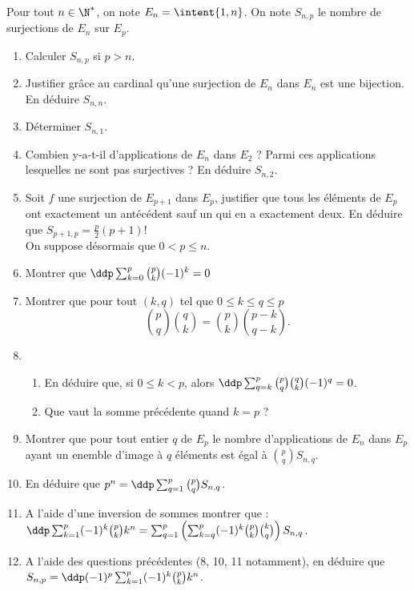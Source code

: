 



\begin{exercice}
Pour tout $n\in \N^*$, on note $E_n=\intent{1,n}$. 
On note $S_{n,p}$ le nombre de surjections de $E_n$ sur $E_p$. 
\begin{enumerate}
\item Calculer $S_{n,p}$ si $p>n$. 
\item Justifier grâce au cardinal qu'une surjection de $E_n$ dans $E_n$ est une bijection. En déduire $S_{n,n}$.
\item Déterminer $S_{n,1}$. 
\item Combien y-a-t-il d'applications de $E_n$ dans $E_2$ ? Parmi ces applications lesquelles ne sont pas surjectives ? En déduire $S_{n,2}$. 
\item Soit $f$ une surjection de $E_{p+1}$ dans $E_p$, justifier que tous les éléments de $E_p$ ont exactement un antécédent sauf un qui en a exactement deux. 
En déduire que $S_{p+1,p} = \frac{p}{2}(p+1)!$\\

On suppose désormais que $0< p \leq n$. 
\item Montrer que $\ddp \sum_{k=0}^p \binom{p}{k}(-1)^k=0$
\item Montrer que pour tout $(k,q)$ tel que $0\leq k \leq q \leq p $ 
$$\binom{p}{q}\binom{q}{k}=\binom{p}{k}\binom{p-k}{q-k}.$$
\item \begin{enumerate}
\item En déduire que, si 
$0\leq k <p$, alors $\ddp \sum_{q=k}^p \binom{p}{q}\binom{q}{k} (-1)^q =0$.
\item  Que vaut la somme précédente quand $k=p$ ?
\end{enumerate}

\item Montrer que pour tout entier $q$ de $E_p$ le nombre d'applications de $E_n$ dans $E_p$ ayant un enemble d'image à $q$ éléments est égal à $\binom{p}{q} S_{n,q}$. 
\item En déduire que $p^n =\ddp \sum_{q=1}^p\binom{p}{q} S_{n,q}$. 
\item A l'aide d'une inversion de sommes montrer que : $\ddp \sum_{k=1}^p (-1)^k \binom{p}{k}k^n=\sum_{q=1}^p \left(\sum_{k=q}^p (-1)^k \binom{p}{k}\binom{k}{q} \right) S_{n,q}  $.
\item A l'aide des questions précédentes (8, 10, 11 notamment), en déduire que $S_{n,p} = \ddp (-1)^p \sum_{k=1}^p (-1)^k \binom{p}{k}k^n$.\\


\end{enumerate}
\end{exercice}
